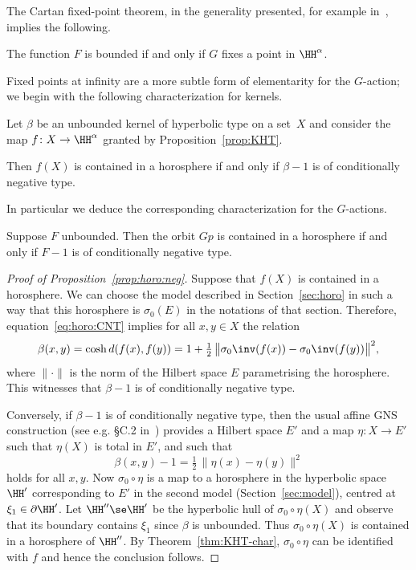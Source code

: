 The Cartan fixed-point theorem, in the generality presented, for example in~\cite[II.2.8]{Bridson-Haefliger}, implies the following.

\begin{lem}\label{lem:Cartan}
The function $F$ is bounded if and only if $G$ fixes a point in $\HH^\alpha$.
\end{lem}

Fixed points at infinity are a more subtle form of elementarity for the $G$-action; we begin with the following characterization for kernels.

\begin{prop}\label{prop:horo:neg}
Let $\beta$ be an unbounded kernel of hyperbolic type on a set~$X$ and consider the map $f\colon X\to\HH^\alpha$ granted by Proposition~\ref{prop:KHT}.

Then $f(X)$ is contained in a horosphere if and only if $\beta-1$ is of conditionally negative type.
\end{prop}

In particular we deduce the corresponding characterization for the $G$-actions.

\begin{coro}\label{cor:horo:neg}
Suppose $F$ unbounded. Then the orbit $G p$ is contained in a horosphere if and only if $F-1$ is of conditionally negative type.
\end{coro}

\begin{proof}[Proof of Proposition~\ref{prop:horo:neg}]
Suppose that $f(X)$ is contained in a horosphere. We can choose the model described in Section~\ref{sec:horo} in such a way that this horosphere is $\sigma_0(E)$ in the notations of that section. Therefore, equation~\eqref{eq:horo:CNT} implies for all $x,y\in X$ the relation
\[
\beta(x, y) = \cosh d(f(x), f(y)) = 1 + \tfrac 12 \, \big\| \sigma_0\inv (f(x)) - \sigma_0\inv (f(y))\big \|^2,
\]
where $\|\cdot\|$ is the norm of the Hilbert space $E$ parametrising the horosphere. This witnesses that $\beta-1$ is of conditionally negative type.

Conversely, if $\beta-1$ is of conditionally negative type, then the usual affine GNS construction (see e.g. \S C.2 in~\cite{Bekka-Harpe-Valette}) provides a Hilbert space $E'$ and a map $\eta\colon X\to E'$ such that $\eta(X)$ is total in $E'$, and such that
\[
\beta(x,y) -1 = \tfrac 12 \, \| \eta(x) - \eta(y) \|^2
\]
holds for all $x,y$. Now $\sigma_0\circ \eta$ is a map to a horosphere in the hyperbolic space $\HH'$ corresponding to $E'$ in the second model (Section~\ref{sec:model}), centred at $\xi_1\in\partial \HH'$. Let $\HH''\se\HH'$ be the hyperbolic hull of $\sigma_0\circ \eta(X)$ and observe that its boundary contains $\xi_1$ since $\beta$ is unbounded. Thus $\sigma_0\circ \eta(X)$ is contained in a horosphere of $\HH''$. By Theorem~\ref{thm:KHT-char}, $\sigma_0\circ \eta$ can be identified with $f$ and hence the conclusion follows.
\end{proof}

